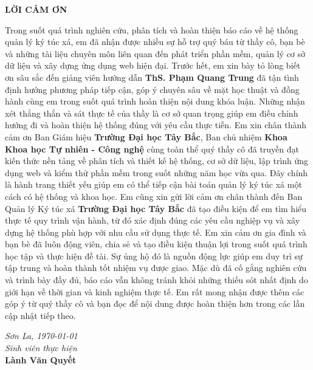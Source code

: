 \documentclass[13pt,a4paper]{extarticle}
\numberwithin{figure}{section}
\numberwithin{table}{section}
\begin{document}
	\setcounter{page}{1}
	\pagestyle{plain}
	
	\begin{center}
		\fontsize{14pt}{20pt}\selectfont
		\textbf{LỜI CẢM ƠN}
	\end{center}
	
	\vspace{20pt}
	
	Trong suốt quá trình nghiên cứu, phân tích và hoàn thiện báo cáo về hệ thống quản lý ký túc xá, em đã nhận được nhiều sự hỗ trợ quý báu từ thầy cô, bạn bè và những tài liệu chuyên môn liên quan đến phát triển phần mềm, quản lý cơ sở dữ liệu và xây dựng ứng dụng web hiện đại.
	Trước hết, em xin bày tỏ lòng biết ơn sâu sắc đến giảng viên hướng dẫn \textbf{ThS. Phạm Quang Trung} đã tận tình định hướng phương pháp tiếp cận, góp ý chuyên sâu về mặt học thuật và đồng hành cùng em trong suốt quá trình hoàn thiện nội dung khóa luận. Những nhận xét thẳng thắn và sát thực tế của thầy là cơ sở quan trọng giúp em điều chỉnh hướng đi và hoàn thiện hệ thống đúng với yêu cầu thực tiễn.
	Em xin chân thành cảm ơn Ban Giám hiệu \textbf{Trường Đại học Tây Bắc}, Ban chủ nhiệm \textbf{Khoa Khoa học Tự nhiên - Công nghệ} cùng toàn thể quý thầy cô đã truyền đạt kiến thức nền tảng về phân tích và thiết kế hệ thống, cơ sở dữ liệu, lập trình ứng dụng web và kiểm thử phần mềm trong suốt những năm học vừa qua. Đây chính là hành trang thiết yếu giúp em có thể tiếp cận bài toán quản lý ký túc xá một cách có hệ thống và khoa học.
	Em cũng xin gửi lời cảm ơn chân thành đến Ban Quản lý Ký túc xá \textbf{Trường Đại học Tây Bắc} đã tạo điều kiện để em tìm hiểu thực tế quy trình vận hành, từ đó xác định đúng các yêu cầu nghiệp vụ và xây dựng hệ thống phù hợp với nhu cầu sử dụng thực tế.
	Em xin cảm ơn gia đình và bạn bè đã luôn động viên, chia sẻ và tạo điều kiện thuận lợi trong suốt quá trình học tập và thực hiện đề tài. Sự ủng hộ đó là nguồn động lực giúp em duy trì sự tập trung và hoàn thành tốt nhiệm vụ được giao.
	Mặc dù đã cố gắng nghiên cứu và trình bày đầy đủ, báo cáo vẫn không tránh khỏi những thiếu sót nhất định do giới hạn về thời gian và kinh nghiệm thực tế. Em rất mong nhận được thêm các góp ý từ quý thầy cô và bạn đọc để nội dung được hoàn thiện hơn trong các lần cập nhật tiếp theo.
	
	\vspace{30pt}
	
	\begin{flushright}
		\textit{Sơn La, \today}\\[10pt]
		\textit{Sinh viên thực hiện}\\[30pt]
		\textbf{Lành Văn Quyết}
	\end{flushright}
	
\end{document}
